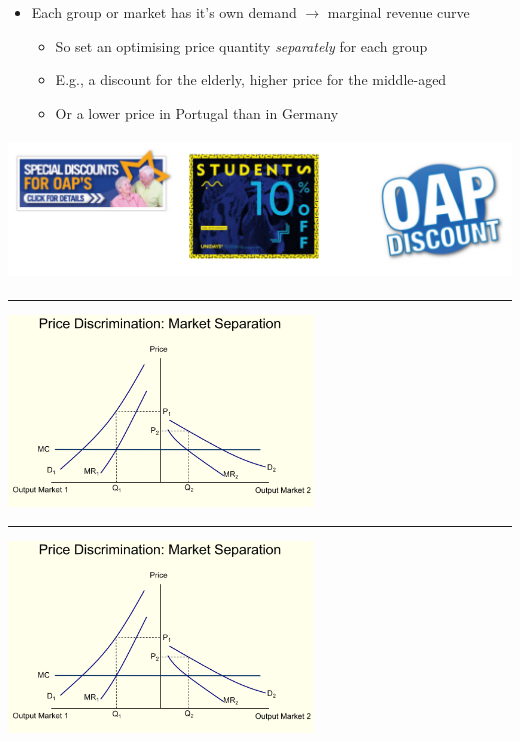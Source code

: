 \documentclass[]{article}
\providecommand{\tightlist}{%
  \setlength{\itemsep}{0pt}\setlength{\parskip}{0pt}}
\begin{document}
\begin{itemize}
\tightlist
\item
  Each group or market has it's own demand \(\rightarrow\) marginal revenue curve

  \begin{itemize}
  \tightlist
  \item
    So set an optimising price quantity \emph{separately} for each group
  \item
    E.g., a discount for the elderly, higher price for the middle-aged
  \item
    Or a lower price in Portugal than in Germany
  \end{itemize}
\end{itemize}

\includegraphics[height=1.5in]{picsfigs/discounts.png}

\begin{center}\rule{0.5\linewidth}{\linethickness}\end{center}

\includegraphics[height=2in]{picsfigs/3dpd.png}

\begin{center}\rule{0.5\linewidth}{\linethickness}\end{center}

\includegraphics[height=2in]{picsfigs/3dpd.png}
\end{document}
